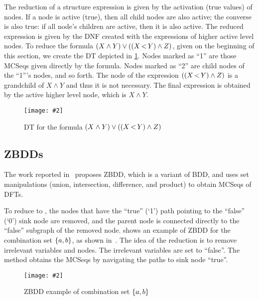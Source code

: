 \documentclass[12pt,openright,twoside,a4paper,oldfontcommands,english,brazil,final]{abntex2}
\theoremstyle{theo}
\newcommand{\includegraphicsaspectratio}[2][1]{%
  \texttt{[image: \#2]}%
}
\newcommand{\setsin}[1]{\ensuremath\left\{ #1 \right\}}
\newcommand{\parsin}[1]{\ensuremath\left( #1 \right)}
\def\pand{\ensuremath\operatorname{<}}
\begin{document}
The reduction of a structure expression is given by the activation (true values) of nodes.
If a node is active (true), then all child nodes are also active; the converse is also true: if all node's children are active, then it is also active.
The reduced expression is given by the \ac{DNF} created with the expressions of higher active level nodes.
To reduce the formula $\parsin{X \land Y} \lor \parsin{\parsin{X \pand Y} \land Z}$, given on the beginning of this section, we create the \ac{DT} depicted in \cref{fig:dependency-tree-reduction}.
Nodes marked as ``1'' are those \acp{MCSeq} given directly by the formula.
Nodes marked as ``2'' are child nodes of the ``1'''s nodes, and so forth.
The node of the expression $\parsin{\parsin{X \pand Y} \land Z}$ is a grandchild of $X \land Y$ and thus it is not necessary.
The final expression is obtained by the active higher level node, which is $X \land Y$.

\begin{figure}[htb]
  \centering
  \includegraphicsaspectratio[0.7]{dependency-tree-reduction}
  \caption{\acs*{DT} for the formula $\parsin{X \land Y} \lor \parsin{\parsin{X \pand Y} \land Z}$}
  \label{fig:dependency-tree-reduction}
\end{figure}

\subsection{\Aclp*{ZBDD}}
\label{sec:zbdd}

The work reported in~\cite{TD2004} proposes \acl{ZBDD}, which is a variant of \ac{BDD}, and uses set manipulations (union, intersection, difference, and product) to obtain \acp{MCSeq} of \acp{DFT}.

To reduce  to , the nodes that have the ``true'' (`1') path pointing to the ``false'' (`0') sink node are removed, and the parent node is connected directly to the ``false'' subgraph of the removed node.
 shows an example of \ac{ZBDD} for the combination set $\setsin{a,b}$, as shown in~\cite{TD2004}.
The idea of the reduction is to remove irrelevant variables and nodes.
The irrelevant variables are set to ``false''.
The method obtains the \acp{MCSeq} by navigating the paths to sink node ``true''.

\begin{figure}[htb]
  \centering
  \includegraphicsaspectratio[0.7]{bdd-zbdd-example}
  \caption{\acs*{ZBDD} example of combination set $\setsin{a,b}$}
  \label{fig:zbdd-example}
\end{figure}
\end{document}
